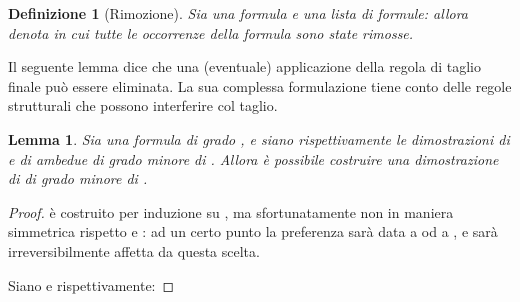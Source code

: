 \documentclass[12pt,a4paper,openright,twoside]{report}
\newtheorem{dfn}[thm]{Definizione}
\newtheorem{lem}[thm]{Lemma}
\begin{document}
\begin{dfn}[Rimozione]
Sia  una formula e  una lista di formule: allora  denota  in cui \emph{tutte le occorrenze} della formula  sono state \emph{rimosse}.
\end{dfn}

Il seguente lemma dice che una (eventuale) applicazione della regola di taglio finale pu\`o essere eliminata. La sua complessa formulazione tiene conto delle regole strutturali che possono interferire col taglio.

\begin{lem}\label{lem:cut_LK2}
Sia  una formula di grado , e siano  rispettivamente le dimostrazioni di  e di  ambedue di grado minore di . Allora \`e possibile costruire una dimostrazione  di  di grado minore di .
\end{lem}
\begin{proof}
 \`e costruito per induzione su , ma sfortunatamente non in maniera simmetrica rispetto  e : ad un certo punto la preferenza sar\`a data a  od a , e  sar\`a irreversibilmente affetta da questa scelta.

Siano  e  rispettivamente:


\end{proof}
\end{document}

